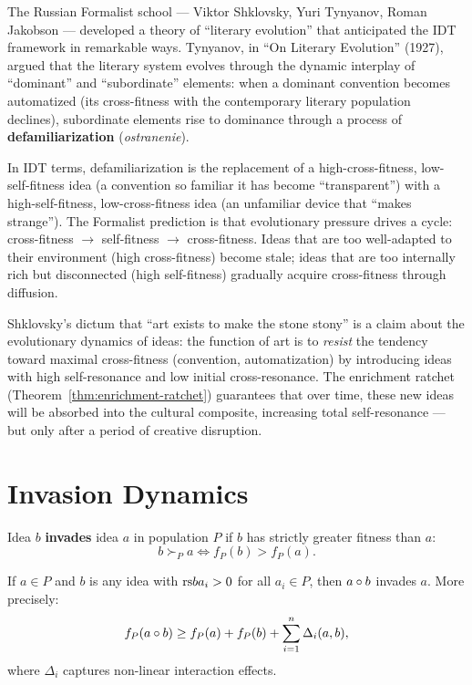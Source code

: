 \begin{interpretation}
\label{interp:ch17:russian_formalism}
The Russian Formalist school --- Viktor Shklovsky, Yuri Tynyanov, Roman
Jakobson --- developed a theory of ``literary evolution'' that anticipated the
IDT framework in remarkable ways.  Tynyanov, in ``On Literary Evolution''
(1927), argued that the literary system evolves through the dynamic
interplay of ``dominant'' and ``subordinate'' elements: when a dominant
convention becomes automatized (its cross-fitness with the contemporary
literary population declines), subordinate elements rise to dominance
through a process of \textbf{defamiliarization} (\textit{ostranenie}).

In IDT terms, defamiliarization is the replacement of a high-cross-fitness,
low-self-fitness idea (a convention so familiar it has become ``transparent'')
with a high-self-fitness, low-cross-fitness idea (an unfamiliar device that
``makes strange'').  The Formalist prediction is that evolutionary pressure
drives a cycle: cross-fitness $\to$ self-fitness $\to$ cross-fitness.
Ideas that are too well-adapted to their environment (high cross-fitness)
become stale; ideas that are too internally rich but disconnected
(high self-fitness) gradually acquire cross-fitness through diffusion.

Shklovsky's dictum that ``art exists to make the stone stony'' is a claim
about the evolutionary dynamics of ideas: the function of art is to
\emph{resist} the tendency toward maximal cross-fitness (convention,
automatization) by introducing ideas with high self-resonance and low
initial cross-resonance.  The enrichment ratchet
(Theorem~\ref{thm:enrichment-ratchet}) guarantees that over time, these
new ideas will be absorbed into the cultural composite, increasing total
self-resonance --- but only after a period of creative disruption.
\end{interpretation}

\section{Invasion Dynamics}

\begin{definition}[Invasion]
\label{def:invasion}
Idea $b$ \textbf{invades} idea $a$ in population $P$ if $b$ has strictly
greater fitness than $a$:
\[
  b \succ_P a \iff f_P(b) > f_P(a).
\]
\end{definition}

\begin{theorem}
\label{thm:invasion-composition}
If $a \in P$ and $b$ is any idea with $\mathrm{rs}{b}{a_i} > 0$ for all $a_i \in P$,
then $a \circ b$ invades $a$.  More precisely:
\[
  f_P(a \circ b) \geq f_P(a) + f_P(b) + \sum_{i=1}^{n} \Delta_i(a, b),
\]
where $\Delta_i$ captures non-linear interaction effects.
\end{theorem}

